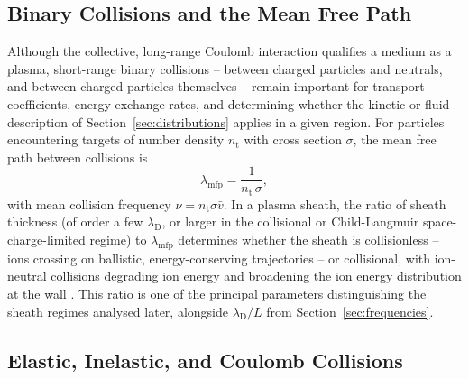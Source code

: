 \subsection{Binary Collisions and the Mean Free Path}

Although the collective, long-range Coulomb interaction qualifies a medium as a plasma, short-range binary collisions -- between charged particles and neutrals, and between charged particles themselves -- remain important for transport coefficients, energy exchange rates, and determining whether the kinetic or fluid description of Section~\ref{sec:distributions} applies in a given region. For particles encountering targets of number density $n_{\mathrm{t}}$ with cross section $\sigma$, the mean free path between collisions is
\begin{equation}
\lambda_{\mathrm{mfp}} = \frac{1}{n_{\mathrm{t}}\,\sigma},
\label{eq:mean-free-path}
\end{equation}
with mean collision frequency $\nu = n_{\mathrm{t}} \sigma \bar{v}$. In a plasma sheath, the ratio of sheath thickness (of order a few $\lambda_{\mathrm{D}}$, or larger in the collisional or Child-Langmuir space-charge-limited regime) to $\lambda_{\mathrm{mfp}}$ determines whether the sheath is collisionless -- ions crossing on ballistic, energy-conserving trajectories -- or collisional, with ion-neutral collisions degrading ion energy and broadening the ion energy distribution at the wall \cite{ref0024,ref0009}. This ratio is one of the principal parameters distinguishing the sheath regimes analysed later, alongside $\lambda_{\mathrm{D}}/L$ from Section~\ref{sec:frequencies}.

\subsection{Elastic, Inelastic, and Coulomb Collisions}

